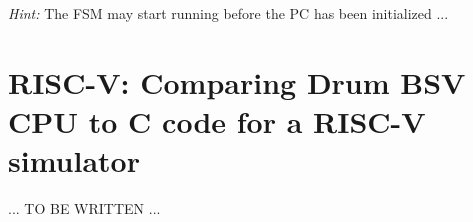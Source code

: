 \emph{Hint:} The FSM may start running before the PC has been initialized ...

\Endexercise


\section{RISC-V: Comparing Drum BSV CPU to C code for a RISC-V simulator}

... TO BE WRITTEN ...

